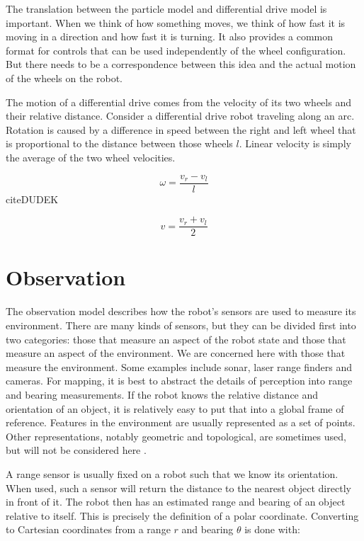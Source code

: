 \documentclass[12pt]{report}
\begin{document}
The translation between the particle model and differential drive model is important.  When we think of how something moves, we think of how fast it is moving in a direction and how fast it is turning.  It also provides a common format for controls that can be used independently of the wheel configuration.  But there needs to be a correspondence between this idea and the actual motion of the wheels on the robot.  

The motion of a differential drive comes from the velocity of its two wheels and their relative distance.  Consider a differential drive robot traveling along an arc.  Rotation is caused by a difference in speed between the right and left wheel that is proportional to the distance between those wheels $l$.  Linear velocity is simply the average of the two wheel velocities.
  
\begin{equation}
\label{differential_drive_rotation}
\omega = \frac{v_r - v_l}{l}
\end{equation}
cite{DUDEK}

\begin{equation}
\label{differential_drive_velocity}
v = \frac{v_r + v_l}{2}
\end{equation}


\section{Observation}
The observation model describes how the robot's sensors are used to measure its environment.  There are many kinds of sensors, but they can be divided first into two categories: those that measure an aspect of the robot state and those that measure an aspect of the environment.  We are concerned here with those that measure the environment.  Some examples include sonar, laser range finders and cameras.  For mapping, it is best to abstract the details of perception into range and bearing measurements.  If the robot knows the relative distance and orientation of an object, it is relatively easy to put that into a global frame of reference.  Features in the environment are usually represented as a set of points. Other representations, notably geometric and topological, are sometimes used, but will not be considered here \cite{SIEGWART}.  

A range sensor is usually fixed on a robot such that we know its orientation.  When used, such a sensor will return the distance to the nearest object directly in front of it.  The robot then has an estimated range and bearing of an object relative to itself.  This is precisely the definition of a polar coordinate.  Converting to Cartesian coordinates from a range $r$ and bearing $\theta$ is done with:
\end{document}
